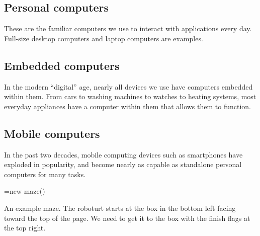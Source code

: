 \subsection{Personal computers}
These are the familiar computers we use to interact with applications every day. Full-size desktop computers and laptop computers are examples.

\subsection{Embedded computers}
In the modern ``digital'' age, nearly all devices we use have computers embedded within them. From cars to washing machines to watches to heating systems, most everyday appliances have a computer within them that allows them to function.

\subsection{Mobile computers}
In the past two decades, mobile computing devices such as smartphones have exploded in popularity, and become nearly as capable as standalone personal computers for many tasks.

\exercisesection

\pgfoonew \maze=new maze()

\begin{marginfigure}[4cm]
  \centering
    \caption{An example maze. The roboturt starts at the box in the bottom left facing toward the top of the page. We need to get it to the box with the finish flags at the top right.}
    \label{fig:graph-paper}
\end{marginfigure}


